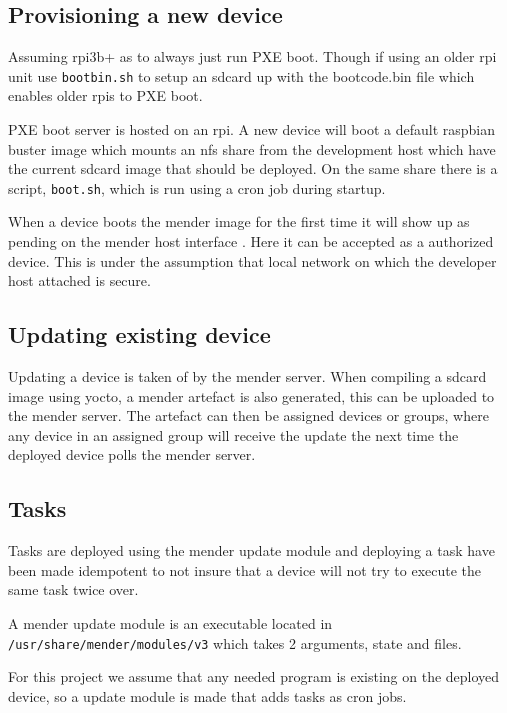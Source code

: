 \documentclass[../../main.tex]{subfiles}
\begin{document}
\subsection{Provisioning a new device}%
\label{sub:provisioning_a_new_device}
Assuming rpi3b+ as to always just run PXE boot. Though if using an older rpi unit use 
\texttt{bootbin.sh} to setup an sdcard up with the bootcode.bin file which
enables older rpis to PXE boot.

PXE boot server is hosted on an rpi. A new device will boot a default raspbian buster image
which mounts an nfs share from the development host which have the current sdcard image that 
should be deployed. On the same share there is a script, \texttt{boot.sh}, which is
run using a cron job during startup.\\


When a device boots the mender image for the first time it will show up as pending on the mender
host interface . Here it can be accepted as a authorized device.
This is under the assumption that local network on which the developer host attached is secure.


\subsection{Updating existing device}%
\label{sub:updating_existing_device}

Updating a device is taken of by the mender server. When compiling a sdcard image using yocto,
a mender artefact is also generated, this can be uploaded to the mender server.
The artefact can then be assigned devices or groups, where any device in an assigned group will
receive the update the next time the deployed device polls the mender server.



\subsection{Tasks}%
\label{sub:tasks}

Tasks are deployed using the mender update module and deploying a task have been made idempotent
to not insure that a device will not try to execute the same task twice over.

A mender update module is an executable located in \texttt{/usr/share/mender/modules/v3}
which takes 2 arguments, state and files.

For this project we assume that any needed program is existing on the deployed device,
so a update module is made that adds tasks as cron jobs.
\end{document}
